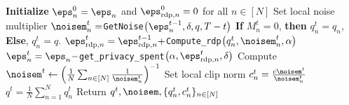 \begin{algorithm}[H]
\begin{algorithmic}[1]
\State \textbf{Initialize} $\eps_n^0 = \eps_n$  and $\eps_{\text{rdp},n}^{0}=0$
for all $n\in [N]$
\State Set local noise multiplier $\noisem_n^t=$\texttt{GetNoise}$\left(\eps_n^{t-1},\delta, q, T-t\right)$
\State \textbf{If} $M_n^t=0$, \textbf{then} $q_n^t = q_n$, \textbf{Else}, $q_n^t = q$.
\State $\eps_{\text{rdp},n}^t=\eps_{\text{rdp},n}^{t-1}+$\texttt{Compute\_rdp}$\left(q_n^t,\noisem_n^t, \alpha\right)$
\State $\eps_n^t=\eps_n-$\texttt{get\_privacy\_spent}$\left(\alpha, \eps_{\text{rdp},n}^t,\delta\right)$
\EndFor
\State Compute $\noisem^t \gets \left(\frac{1}{N}\sum_{n\in [N]}\frac{1}{\noisem_n^t}\right)^{-1}$
\State Set local clip norm $c_n^t=\frac{c\noisem^t}{\noisem_n^t}$
\EndFor
\EndFor
\State $q^t = \frac{1}{N} \sum_{n=1}^N q_n^t$
\State Return $q^t, \noisem, \{q_n^t, c_n^t\}_{n\in [N]}$
\end{algorithmic}
\end{algorithm}